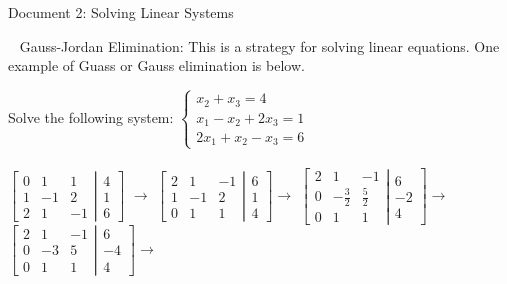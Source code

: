 \documentclass[12pt]{article}
\begin{document}
\newpage
\begin{center}
Document 2: Solving Linear Systems
\end{center}

\setlength{\leftskip}{0in}
$\,\,\,$ Gauss-Jordan Elimination: This is a strategy for solving linear equations. One example of Guass or Gauss elimination is below.

Solve the following system:
$
\left\lbrace
\begin{matrix}
x_2+x_3=4\\
x_1-x_2+2x_3=1\\
2x_1+x_2-x_3=6
\end{matrix}
\right.
$\\\\

$\left[\left.\begin{matrix}
0 & 1 & 1\\
1 & -1 & 2\\
2 & 1 & -1
\end{matrix}
\right|
\begin{matrix}
4\\
1\\
6
\end{matrix}
\right]
$
$\rightarrow$
$\left[\left.\begin{matrix}
2 & 1 & -1\\
1 & -1 & 2\\
0 & 1 & 1
\end{matrix}
\right|
\begin{matrix}
6\\
1\\
4
\end{matrix}
\right]
\rightarrow$
$\left[\left.\begin{matrix}
2 & 1 & -1\\
0 & -\frac{3}{2} & \frac{5}{2}\\
0 & 1 & 1
\end{matrix}
\right|
\begin{matrix}
6\\
-2\\
4
\end{matrix}
\right]
\rightarrow$
$\left[\left.\begin{matrix}
2 & 1 & -1\\
0 & -3 & 5\\
0 & 1 & 1
\end{matrix}
\right|
\begin{matrix}
6\\
-4\\
4
\end{matrix}
\right]
\rightarrow$\\\\
\end{document}
